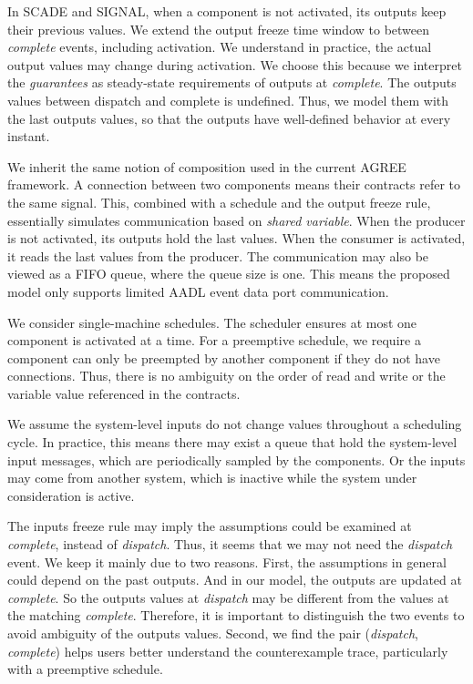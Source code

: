 In SCADE and SIGNAL, when a component is not activated, its outputs keep their previous values. We extend the output freeze time window to between \emph{complete} events, including activation. We understand in practice, the actual output values may change during activation. We choose this because we interpret the \emph{guarantees} as steady-state requirements of outputs at \emph{complete}. The outputs values between dispatch and complete is undefined. Thus, we model them with the last outputs values, so that the outputs have well-defined behavior at every instant.

We inherit the same notion of composition used in the current AGREE framework. A connection between two components means their contracts refer to the same signal. 
This, combined with a schedule and the output freeze rule, essentially simulates communication based on \emph{shared variable}. When the producer is not activated, its outputs hold the last values. When the consumer is activated, it reads the last values from the producer. The communication may also be viewed as a FIFO queue, where the queue size is one. %
This means the proposed model only supports limited AADL event data port communication.

We consider single-machine schedules. The scheduler ensures at most one component is activated at a time. For a preemptive schedule, we require a component can only be preempted by another component if they do not have connections. Thus, there is no ambiguity on the order of read and write or the variable value referenced in the contracts.
 
We assume the system-level inputs do not change values throughout a scheduling cycle. In practice, this means there may exist a queue that hold the system-level input messages, which are periodically sampled by the components. Or the inputs may come from another system, which is inactive while the system under consideration is active.

The inputs freeze rule may imply the assumptions could be examined at \emph{complete}, instead of \emph{dispatch}. Thus, it seems that we may not need the \emph{dispatch} event. We keep it mainly due to two reasons. First, the assumptions in general could depend on the past outputs. And in our model, the outputs are updated at \emph{complete}. So the outputs values at \emph{dispatch} may be different from the values at the matching \emph{complete}. Therefore, it is important to distinguish the two events to avoid ambiguity of the outputs values. Second, we find the pair (\emph{dispatch}, \emph{complete}) helps users better understand the counterexample trace, particularly with a preemptive schedule.

